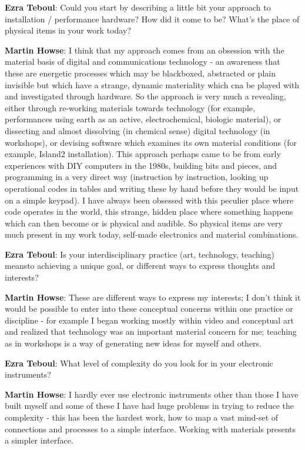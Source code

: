 \textbf{Ezra Teboul}: Could you start by describing a little bit your approach to
installation / performance hardware? How did it come to be? What's the place of physical
items in your work today?

\textbf{Martin Howse}: I think that my approach comes from an obsession with the
material basis of digital and communications technology - an awareness that these are
energetic processes which may be blackboxed, abstracted or plain invisible but which
have a strange, dynamic materiality which cna be played with and investigated through
hardware. So the approach is very much a revealing, either through re-working materials
towards technology (for example, performances using earth as an active, electrochemical,
biologic material), or dissecting and almost dissolving (in chemical sense) digital
technology (in workshops), or devising software which examines its own material
conditions (for example, Island2 installation). This approach perhaps came to be from
early experiences with DIY computers in the 1980s, building bits and pieces, and
programming in a very direct way (instruction by instruction, looking up operational
codes in tables and writing these by hand before they would be input on a simple
keypad). I have always been obsessed with this peculier place where code operates in the
world, this strange, hidden place where something happens which can then become or is
physical and audible. So physical items are very much present in my work today,
self-made electronics and material combinations.

\textbf{Ezra Teboul}: Is your interdisciplinary practice (art, technology, teaching)
meansto achieving a unique goal, or different ways to express thoughts and interests?

\textbf{Martin Howse}: These are different ways to express my interests; I don't think
it would be possible to enter into these conceptual concerns within one practice or
discipline - for example I began working mostly within video and conceptual art and
realized that technology was an important material concern for me; teaching as in
workshops is a way of generating new ideas for myself and others.

\textbf{Ezra Teboul}: What level of complexity do you look for in your electronic
instruments?

\textbf{Martin Howse}: I hardly ever use electronic instruments other than those I have
built myself and some of these I have had huge problems in trying to reduce the
complexity - this has been the hardest work, how to map a vast mind-set of connections
and processes to a simple interface. Working with materials presents a simpler interface.

